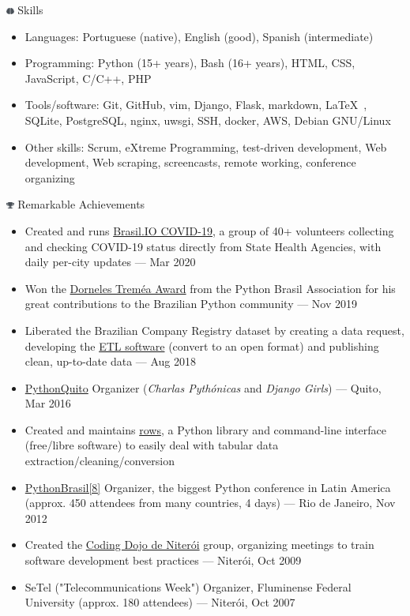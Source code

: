 \documentclass[a4paper,11pt]{article}
\begin{document}
\begin{section}{\includegraphics[height=0.6em]{icon-skills} Skills}
	\begin{itemize}
		\item Languages: Portuguese (native), English (good), Spanish
			(intermediate)
		\item Programming: Python (15+ years), Bash (16+ years), HTML, CSS,
			JavaScript, C/C++, PHP
		\item Tools/software: Git, GitHub, vim, Django, Flask, markdown,
			\LaTeX\ , SQLite, PostgreSQL, nginx, uwsgi, SSH, docker, AWS,
			Debian GNU/Linux
		\item Other skills: Scrum, eXtreme Programming, test-driven
			development, Web development, Web scraping, screencasts, remote
			working, conference organizing
	\end{itemize}
\end{section}

\begin{section}{\includegraphics[height=0.6em]{icon-achievement} Remarkable Achievements}
	\begin{itemize}
		\item Created and runs \href{https://brasil.io/covid19/}{Brasil.IO
			COVID-19}, a group of 40+ volunteers collecting and checking
			COVID-19 status directly from State Health Agencies, with daily
			per-city updates --- Mar 2020
		\item Won the
			\href{https://python.org.br/premio-dorneles-tremea/}{Dorneles
			Treméa Award} from the Python Brasil Association for his great
			contributions to the Brazilian Python community --- Nov 2019
		\item Liberated the Brazilian Company Registry dataset by creating a
			data request, developing the
			\href{https://github.com/turicas/socios-brasil}{ETL software}
			(convert to an open format) and publishing clean, up-to-date
			data --- Aug 2018
		\item \href{http://pythonquito.tk}{PythonQuito} Organizer
			(\textit{Charlas Pythónicas} and \textit{Django Girls}) --- Quito,
			Mar 2016
		\item Created and maintains
			\href{https://github.com/turicas/rows}{rows}, a Python library and
			command-line interface (free/libre software) to easily deal with
			tabular data extraction/cleaning/conversion
		\item \href{http://2012.pythonbrasil.org.br/}{PythonBrasil[8]}
			Organizer, the biggest Python conference in Latin America (approx.
			450 attendees from many countries, 4 days) --- Rio
			de Janeiro, Nov 2012
		\item Created the \href{http://dojorio.org}{Coding Dojo de Niterói}
			group, organizing meetings to train software development best
			practices --- Niterói, Oct 2009
		\item SeTel ("Telecommunications Week") Organizer, Fluminense Federal
			University (approx. 180 attendees) --- Niterói, Oct 2007
	\end{itemize}
\end{section}
\end{document}
